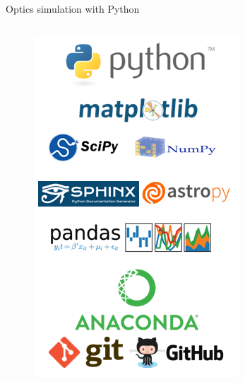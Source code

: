 \documentclass[serif ,mathserif, 8pt]{beamer}
\begin{document}
\begin{frame}{Optics simulation with Python}
\begin{columns}[c]
	\begin{column}{0.4\textwidth}
		\begin{figure}
			\includegraphics[width=.8\linewidth]{images/python}
		\end{figure}
	\end{column}
\end{columns}

\end{frame}
\end{document}
